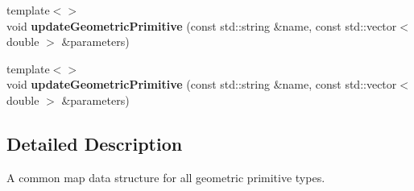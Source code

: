 \begin{DoxyCompactItemize}
\item 
\hypertarget{classhiqp_1_1geometric__primitives_1_1GeometricPrimitiveMap_afede16f63460bb07795ee12b426ee919}{{\footnotesize template$<$$>$ }\\void {\bfseries update\-Geometric\-Primitive} (const std\-::string \&name, const std\-::vector$<$ double $>$ \&parameters)}\label{classhiqp_1_1geometric__primitives_1_1GeometricPrimitiveMap_afede16f63460bb07795ee12b426ee919}

\item 
\hypertarget{classhiqp_1_1geometric__primitives_1_1GeometricPrimitiveMap_afede16f63460bb07795ee12b426ee919}{{\footnotesize template$<$$>$ }\\void {\bfseries update\-Geometric\-Primitive} (const std\-::string \&name, const std\-::vector$<$ double $>$ \&parameters)}\label{classhiqp_1_1geometric__primitives_1_1GeometricPrimitiveMap_afede16f63460bb07795ee12b426ee919}

\end{DoxyCompactItemize}


\subsection{Detailed Description}
A common map data structure for all geometric primitive types. 

